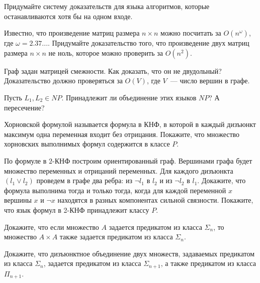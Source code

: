 \setcounter{curtask}{25}


\begin{task}
	Придумайте систему доказательств для языка алгоритмов, которые останавливаются
    хотя бы на одном входе.
\end{task}

\begin{task}
    Известно, что произведение матриц размера $n \times n$ можно посчитать за
    $O(n^{\omega})$, где $\omega =  2.37...$. Придумайте доказательство того, что 
    произведение двух матриц размера $n \times n$ не ноль, которое можно проверить за
    $O(n^2)$.
\end{task}

\begin{task}
    Граф задан матрицей смежности. Как доказать, что он не двудольный? Доказательство
    должно проверяться за $O(V)$, где $V$~--- число вершин в графе.
\end{task}


\begin{task}
    Пусть $L_1, L_2 \in NP$. Принадлежит ли объединение этих языков $NP$? А пересечение?
\end{task}

\begin{task}
    Хорновской формулой называется формула в КНФ, в которой в каждый дизъюнкт
    максимум одна переменная входит без отрицания. Покажите, что множество
    хорновских выполнимых формул содержится в классе $P$.
\end{task}

\begin{task}
    По формуле в $2$-КНФ построим ориентированный граф. Вершинами графа будет
    множество переменных и отрицаний переменных. Для каждого дизъюнкта $(l_1 \lor
    l_2)$ проведем в графе два ребра: из $\neg l_1$ в $l_2$ и из $\neg l_2$ в
    $l_1$. Докажите, что формула выполнима тогда и только тогда, когда для каждой
    переменной $x$ вершины $x$ и $\neg x$ находятся в разных компонентах сильной
    связности. Покажите, что язык формул в 2-КНФ принадлежит классу $P$.
\end{task}


\breakline


\begin{ptask}{23}
    Докажите, что если множество $A$ задается предикатом из класса $\Sigma_n$, то
    множество $A \times A$ также задается предикатом из класса $\Sigma_n$.
\end{ptask}

\begin{ptask}{24}
    Докажите, что дизъюнктное объединение двух множеств, задаваемых предикатом из
    класса $\Sigma_n$, задается предикатом из класса $\Sigma_{n + 1}$, а также
    предикатом из класса $\Pi_{n + 1}$.
\end{ptask}

